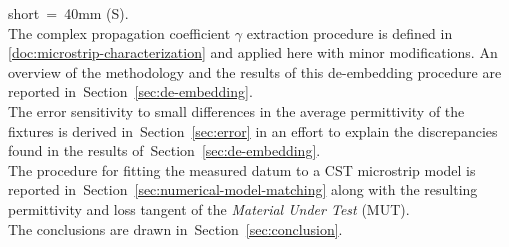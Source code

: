 \documentclass[11pt,a4paper]{article}
\newcommand{\sref}[1]{Section~\ref{#1}}
\begin{document}
    short~=~40mm (S).\\
    The complex propagation coefficient $\gamma$ extraction procedure is defined in \ref{doc:microstrip-characterization} and
    applied here with minor modifications.
    An overview of the methodology and the results of this de-embedding procedure are reported in~\sref{sec:de-embedding}.\\
    The error sensitivity to small differences in the average permittivity of the fixtures is derived in~\sref{sec:error}
    in an effort to explain the discrepancies found in the results of~\sref{sec:de-embedding}.\\
    The procedure for fitting the measured datum to a CST microstrip model is reported in~\sref{sec:numerical-model-matching}
    along with the resulting permittivity and loss tangent of the \emph{Material Under Test} (MUT).\\
    The conclusions are drawn in~\sref{sec:conclusion}.
\end{document}
